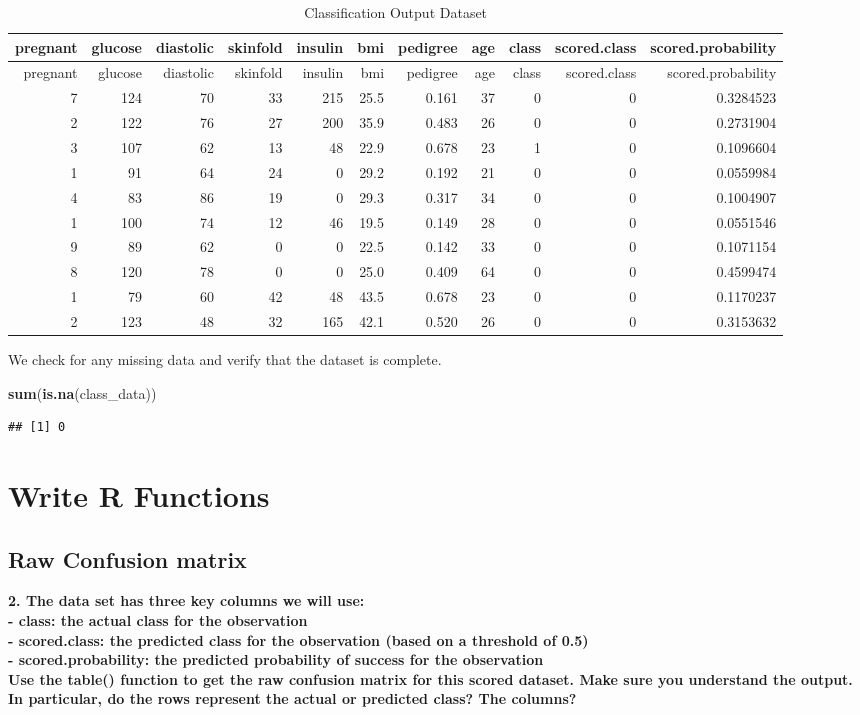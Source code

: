 \documentclass[]{article}
\newenvironment{Shaded}{\begin{snugshade}}{\end{snugshade}}
\newcommand{\KeywordTok}[1]{\textcolor[rgb]{0.13,0.29,0.53}{\textbf{#1}}}
\newcommand{\NormalTok}[1]{#1}
\begin{document}
\begin{longtable}[]{@{}rrrrrrrrrrr@{}}
\caption{Classification Output Dataset}\tabularnewline
\toprule
pregnant & glucose & diastolic & skinfold & insulin & bmi & pedigree &
age & class & scored.class & scored.probability\tabularnewline
\midrule
\endfirsthead
\toprule
pregnant & glucose & diastolic & skinfold & insulin & bmi & pedigree &
age & class & scored.class & scored.probability\tabularnewline
\midrule
\endhead
7 & 124 & 70 & 33 & 215 & 25.5 & 0.161 & 37 & 0 & 0 &
0.3284523\tabularnewline
2 & 122 & 76 & 27 & 200 & 35.9 & 0.483 & 26 & 0 & 0 &
0.2731904\tabularnewline
3 & 107 & 62 & 13 & 48 & 22.9 & 0.678 & 23 & 1 & 0 &
0.1096604\tabularnewline
1 & 91 & 64 & 24 & 0 & 29.2 & 0.192 & 21 & 0 & 0 &
0.0559984\tabularnewline
4 & 83 & 86 & 19 & 0 & 29.3 & 0.317 & 34 & 0 & 0 &
0.1004907\tabularnewline
1 & 100 & 74 & 12 & 46 & 19.5 & 0.149 & 28 & 0 & 0 &
0.0551546\tabularnewline
9 & 89 & 62 & 0 & 0 & 22.5 & 0.142 & 33 & 0 & 0 &
0.1071154\tabularnewline
8 & 120 & 78 & 0 & 0 & 25.0 & 0.409 & 64 & 0 & 0 &
0.4599474\tabularnewline
1 & 79 & 60 & 42 & 48 & 43.5 & 0.678 & 23 & 0 & 0 &
0.1170237\tabularnewline
2 & 123 & 48 & 32 & 165 & 42.1 & 0.520 & 26 & 0 & 0 &
0.3153632\tabularnewline
\bottomrule
\end{longtable}

We check for any missing data and verify that the dataset is complete.

\begin{Shaded}
\begin{Highlighting}[]
\KeywordTok{sum}\NormalTok{(}\KeywordTok{is.na}\NormalTok{(class_data))}
\end{Highlighting}
\end{Shaded}

\begin{verbatim}
## [1] 0
\end{verbatim}

\hypertarget{write-r-functions}{%
\section{Write R Functions}\label{write-r-functions}}

\hypertarget{raw-confusion-matrix}{%
\subsection{Raw Confusion matrix}\label{raw-confusion-matrix}}

\textbf{2. The data set has three key columns we will use: }\\
\textbf{- class: the actual class for the observation}\\
\textbf{- scored.class: the predicted class for the observation (based
on a threshold of 0.5) }\\
\textbf{- scored.probability: the predicted probability of success for
the observation}\\
\textbf{Use the table() function to get the raw confusion matrix for
this scored dataset. Make sure you understand the output. In particular,
do the rows represent the actual or predicted class? The columns?}
\end{document}
